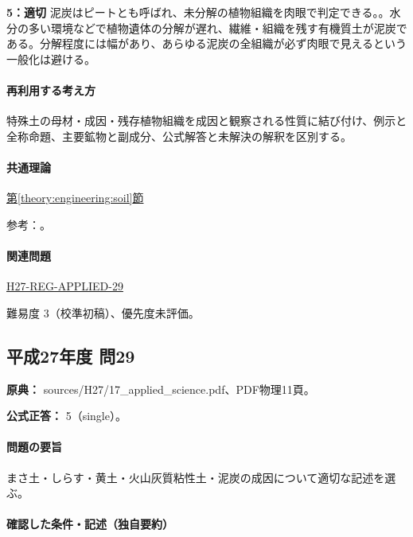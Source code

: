 \noindent\textbf{5：適切} 泥炭はピートとも呼ばれ、未分解の植物組織を肉眼で判定できる。。水分の多い環境などで植物遺体の分解が遅れ、繊維・組織を残す有機質土が泥炭である。分解程度には幅があり、あらゆる泥炭の全組織が必ず肉眼で見えるという一般化は避ける。\par

\paragraph{再利用する考え方} 特殊土の母材・成因・残存植物組織を成因と観察される性質に結び付け、例示と全称命題、主要鉱物と副成分、公式解答と未解決の解釈を区別する。

\paragraph{共通理論} \hyperref[theory:engineering:soil]{第\ref*{theory:engineering:soil}節}

\par 参考：\cite{mlit_masa,maff_shiras2017,mlit_peat,gsj_loess2002}。

\paragraph{関連問題} \hyperref[q:h27-reg-applied-29]{H27-REG-APPLIED-29}

\par 難易度 3（校準初稿）、優先度未評価。

\subsection{平成27年度 問29}
\label{q:h27-reg-applied-29}

\noindent\textbf{原典：} sources/H27/17\_applied\_science.pdf、PDF物理11頁。

\textbf{公式正答：} 5（single）。

\paragraph{問題の要旨} まさ土・しらす・黄土・火山灰質粘性土・泥炭の成因について適切な記述を選ぶ。

\paragraph{確認した条件・記述（独自要約）}\mbox{}\par

